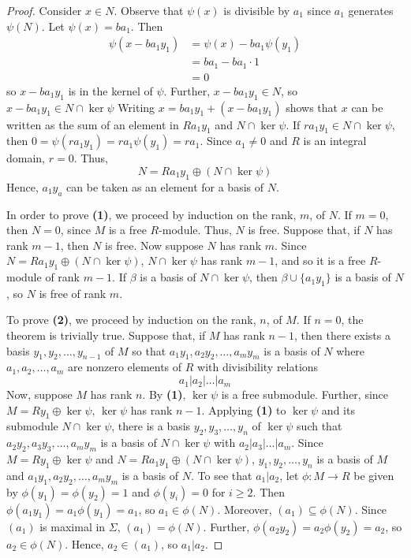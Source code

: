 \documentclass[12pt,leqno]{article}
\numberwithin{equation}{section}
\theoremstyle{definition}
\begin{document}
\begin{proof}
Consider $x\in N$. Observe that $\psi(x)$ is divisible by $a_1$ since $a_1$ generates $\psi(N)$. Let $\psi(x)=ba_1$. Then \begin{align*}\psi(x-ba_1y_1)&=\psi(x)-ba_1\psi(y_1)\\&=ba_1-ba_1\cdot1\\&=0\end{align*} so $x-ba_1y_1$ is in the kernel of $\psi$. Further, $x-ba_1y_1\in N$, so $x-ba_1y_1\in N\cap\ker\psi$ Writing $x=ba_1y_1+(x-ba_1y_1)$ shows that $x$ can be written as the sum of an element in $Ra_1y_1$ and $N\cap\ker\psi$. If $ra_1y_1\in N\cap\ker\psi$, then $0=\psi(ra_1y_1)=ra_1\psi(y_1)=ra_1$. Since $a_1\not=0$ and $R$ is an integral domain, $r=0$. Thus, \[N=Ra_1y_1\oplus(N\cap\ker\psi)\] Hence, $a_1y_a$ can be taken as  an element for a basis of $N$.

In order to prove \textbf{(1)}, we proceed by induction on the rank, $m$, of $N$. If $m=0$, then $N=0$, since $M$ is a free $R$-module. Thus, $N$ is free. Suppose that, if $N$ has rank $m-1$, then $N$ is free. Now suppose $N$ has rank $m$. Since $N=Ra_1y_1\oplus(N\cap\ker\psi)$, $N\cap\ker\psi$ has rank $m-1$, and so it is a free $R$-module of rank $m-1$. If $\beta$ is a basis of $N\cap\ker\psi$, then $\beta\cup\{a_1y_1\}$ is a basis of $N$, so $N$ is free of rank $m$.

To prove \textbf{(2)}, we proceed by induction on the rank, $n$, of $M$. If $n=0$, the theorem is trivially true. Suppose that, if $M$ has rank $n-1$, then there exists a basis $y_1,y_2,\hdots,y_{n-1}$ of $M$ so that $a_1y_1,a_2y_2,\hdots,a_my_m$ is a basis of $N$ where $a_1,a_2,\hdots,a_m$ are nonzero elements of $R$ with divisibility relations \[a_1|a_2|\hdots|a_m\] Now, suppose $M$ has rank $n$. By \textbf{(1)}, $\ker\psi$ is a free submodule. Further, since $M=Ry_1\oplus\ker\psi$, $\ker\psi$ has rank $n-1$. Applying \textbf{(1)} to $\ker\psi$ and its submodule $N\cap\ker\psi$, there is a basis $y_2,y_3,\hdots,y_n$ of $\ker\psi$ such that $a_2y_2,a_3y_3,\hdots,a_my_m$ is a basis of $N\cap\ker\psi$ with $a_2|a_3|\hdots|a_m$. Since $M=Ry_1\oplus\ker\psi$ and $  N=Ra_1y_1\oplus(N\cap\ker\psi)$, $y_1,y_2,\hdots,y_n$ is a basis of $M$ and $a_1y_1,a_2y_2,\hdots,a_my_m$ is a basis of $N$. To see that $a_1|a_2$, let $\phi:M\to R$ be given by $\phi(y_1)=\phi(y_2)=1$ and $\phi(y_i)=0$ for $i\geq2$. Then $\phi(a_1y_1)=a_1\phi(y_1)=a_1$, so $a_1\in\phi(N)$. Moreover, $(a_1)\subseteq\phi(N)$. Since $(a_1)$ is maximal in $\Sigma$, $(a_1)=\phi(N)$. Further, $\phi(a_2y_2)=a_2\phi(y_2)=a_2$, so $a_2\in\phi(N)$. Hence, $a_2\in(a_1)$, so $a_1|a_2$.
\end{proof}
\end{document}
